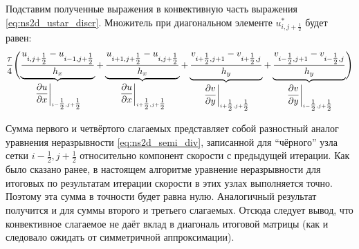 Подставим полученные выражения в конвективную часть выражения \eqref{eq:ns2d_ustar_discr}.
Множитель при диагональном элементе $u^*_{i,j+\tfrac12}$ будет равен:
\begin{align*}
        \frac{\tau}{4}\Biggl(
         \underbrace{\frac{u_{i,j+\tfrac12} - u_{i-1,j+\tfrac12}}{h_x}}_{\left.\dfrac{\partial u}{\partial x}\right|_{i-\tfrac12,j+\tfrac12}}
        +\underbrace{\frac{u_{i+1,j+\tfrac12} - u_{i,j+\tfrac12}}{h_x}}_{\left.\dfrac{\partial u}{\partial x}\right|_{i+\tfrac12,j+\tfrac12}}
        +\underbrace{\frac{v_{i+\tfrac12,j+1} - v_{i+\tfrac12,j}}{h_y}}_{\left.\dfrac{\partial v}{\partial y}\right|_{i+\tfrac12,j+\tfrac12}}
        +\underbrace{\frac{v_{i-\tfrac12,j+1} - v_{i-\tfrac12,j}}{h_y}}_{\left.\dfrac{\partial v}{\partial y}\right|_{i-\tfrac12,j+\tfrac12}}
        \Biggr)
\end{align*}

Сумма первого и четвёртого слагаемых представляет собой разностный
аналог уравнения неразрывности \eqref{eq:ns2d_semi_div}, записанной для ``чёрного'' узла
сетки $i-\tfrac12, j+\tfrac12$ относительно компонент
скорости с предыдущей итерации.
Как было сказано ранее,
в настоящем алгоритме
уравнение неразрывности для итоговых по результатам итерации скорости в этих узлах выполняется точно.
Поэтому эта сумма в точности будет равна нулю. Аналогичный результат получится
и для суммы второго и третьего слагаемых. Отсюда следует вывод, что
конвективное слагаемое не даёт вклад в диагональ итоговой матрицы (как и следовало ожидать от симметричной аппроксимации).


